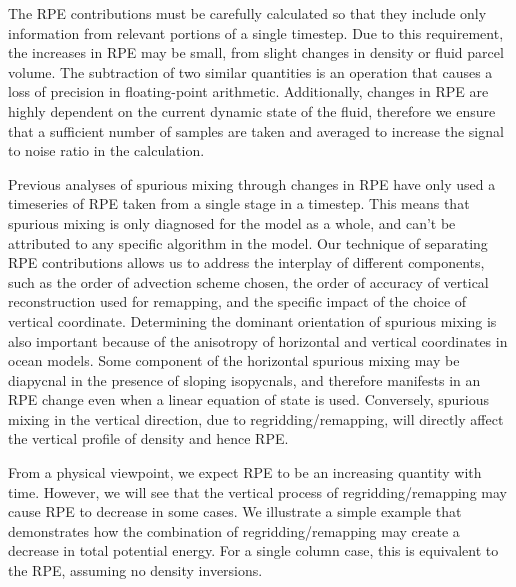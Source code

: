 The RPE contributions must be carefully calculated so that they include only information from relevant portions of a single timestep. Due to this requirement, the increases in RPE may be small, from slight changes in density or fluid parcel volume. The subtraction of two similar quantities is an operation that causes a loss of precision in floating-point arithmetic. Additionally, changes in RPE are highly dependent on the current dynamic state of the fluid, therefore we ensure that a sufficient number of samples are taken and averaged to increase the signal to noise ratio in the calculation.


Previous analyses of spurious mixing through changes in RPE have only used a timeseries of RPE taken from a single stage in a timestep. This means that spurious mixing is only diagnosed for the model as a whole, and can't be attributed to any specific algorithm in the model. Our technique of separating RPE contributions allows us to address the interplay of different components, such as the order of advection scheme chosen, the order of accuracy of vertical reconstruction used for remapping, and the specific impact of the choice of vertical coordinate. Determining the dominant orientation of spurious mixing is also important because of the anisotropy of horizontal and vertical coordinates in ocean models. Some component of the horizontal spurious mixing may be diapycnal in the presence of sloping isopycnals, and therefore manifests in an RPE change even when a linear equation of state is used. Conversely, spurious mixing in the vertical direction, due to regridding/remapping, will directly affect the vertical profile of density and hence RPE.

From a physical viewpoint, we expect RPE to be an increasing quantity with time. However, we will see that the vertical process of regridding/remapping may cause RPE to decrease in some cases. We illustrate a simple example that demonstrates how the combination of regridding/remapping may create a decrease in total potential energy. For a single column case, this is equivalent to the RPE, assuming no density inversions.



